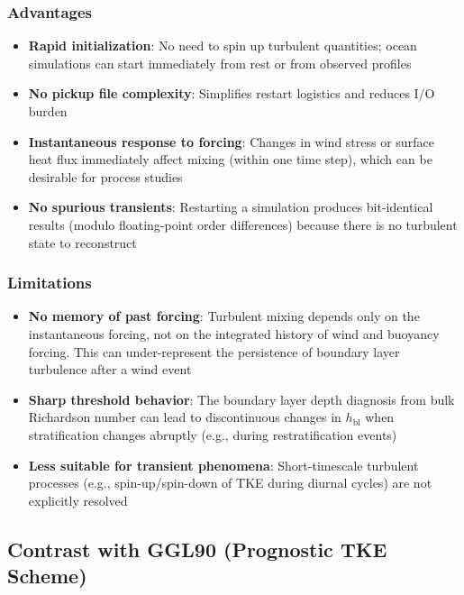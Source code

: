 \documentclass[12pt,letterpaper]{article}
\begin{document}
\subsubsection{Advantages}

\begin{itemize}[leftmargin=*]
  \item \textbf{Rapid initialization}: No need to spin up turbulent quantities;
        ocean simulations can start immediately from rest or from observed profiles
  \item \textbf{No pickup file complexity}: Simplifies restart logistics and
        reduces I/O burden
  \item \textbf{Instantaneous response to forcing}: Changes in wind stress or
        surface heat flux immediately affect mixing (within one time step), which
        can be desirable for process studies
  \item \textbf{No spurious transients}: Restarting a simulation produces
        bit-identical results (modulo floating-point order differences) because
        there is no turbulent state to reconstruct
\end{itemize}

\subsubsection{Limitations}

\begin{itemize}[leftmargin=*]
  \item \textbf{No memory of past forcing}: Turbulent mixing depends only on
        the instantaneous forcing, not on the integrated history of wind and buoyancy
        forcing. This can under-represent the persistence of boundary layer turbulence
        after a wind event
  \item \textbf{Sharp threshold behavior}: The boundary layer depth diagnosis from
        bulk Richardson number can lead to discontinuous changes in $h_{\text{bl}}$
        when stratification changes abruptly (e.g., during restratification events)
  \item \textbf{Less suitable for transient phenomena}: Short-timescale turbulent
        processes (e.g., spin-up/spin-down of TKE during diurnal cycles) are not
        explicitly resolved
\end{itemize}

\subsection{Contrast with GGL90 (Prognostic TKE Scheme)}
\end{document}
